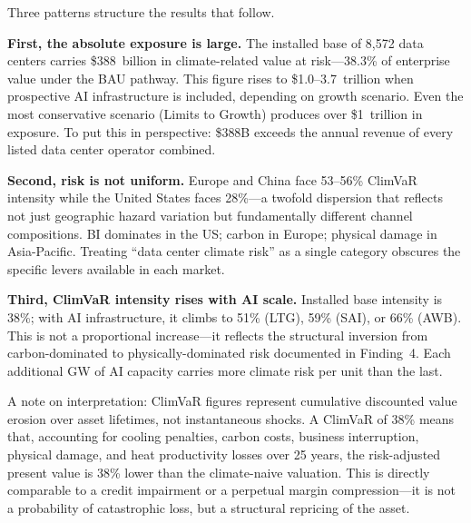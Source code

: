 
\begin{twocolbody}

\noindent Three patterns structure the results that follow.

\textbf{First, the absolute exposure is large.} The installed base of 8,572 data centers carries \$388~billion in climate-related value at risk---38.3\% of enterprise value under the BAU pathway. This figure rises to \$1.0--3.7~trillion when prospective AI infrastructure is included, depending on growth scenario. Even the most conservative scenario (Limits to Growth) produces over \$1~trillion in exposure. To put this in perspective: \$388B exceeds the annual revenue of every listed data center operator combined.

\textbf{Second, risk is not uniform.} Europe and China face 53--56\% ClimVaR intensity while the United States faces 28\%---a twofold dispersion that reflects not just geographic hazard variation but fundamentally different channel compositions. BI dominates in the US; carbon in Europe; physical damage in Asia-Pacific. Treating ``data center climate risk'' as a single category obscures the specific levers available in each market.

\textbf{Third, ClimVaR intensity rises with AI scale.} Installed base intensity is 38\%; with AI infrastructure, it climbs to 51\% (LTG), 59\% (SAI), or 66\% (AWB). This is not a proportional increase---it reflects the structural inversion from carbon-dominated to physically-dominated risk documented in Finding~4. Each additional GW of AI capacity carries more climate risk per unit than the last.

A note on interpretation: ClimVaR figures represent cumulative discounted value erosion over asset lifetimes, not instantaneous shocks. A ClimVaR of 38\% means that, accounting for cooling penalties, carbon costs, business interruption, physical damage, and heat productivity losses over 25 years, the risk-adjusted present value is 38\% lower than the climate-naive valuation. This is directly comparable to a credit impairment or a perpetual margin compression---it is not a probability of catastrophic loss, but a structural repricing of the asset.

\end{twocolbody}

